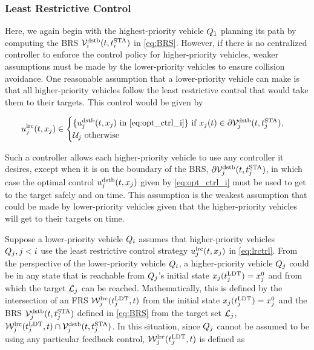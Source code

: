 \subsubsection{Least Restrictive Control \label{sec:lrc}}
Here, we again begin with the highest-priority vehicle $Q_1$ planning its path by computing the BRS $\mathcal{V}_i^\text{dstb}(t, t^\text{STA}_i)$ in \eqref{eq:BRS}. However, if there is no centralized controller to enforce the control policy for higher-priority vehicles, weaker assumptions must be made by the lower-priority vehicles to ensure collision avoidance. One reasonable assumption that a lower-priority vehicle can make is that all higher-priority vehicles follow the least restrictive control that would take them to their targets. This control would be given by 

\begin{equation}
\label{eq:lrctrl} %
\ctrl_j^\text{lrc}(t, \state_j)\in \begin{cases} \{\ctrl_j^\text{dstb}(t, \state_j) \text{ in } \eqref{eq:opt_ctrl_i}\} \text{ if } \state_j(t)\in \partial \brs_j^\text{dstb}(t, \sta_j), \\
\cset_j  \text{ otherwise}
\end{cases}
\end{equation}

Such a controller allows each higher-priority vehicle to use any controller it desires, except when it is on the boundary of the BRS, $\partial \mathcal{V}_j^\text{dstb}(t, t^\text{STA}_j)$, in which case the optimal control $u_j^\text{dstb}(t, x_j)$ given by \eqref{eq:opt_ctrl_i} must be used to get to the target safely and on time. This assumption is the weakest assumption that could be made by lower-priority vehicles given that the higher-priority vehicles will get to their targets on time.

Suppose a lower-priority vehicle $Q_i$ assumes that higher-priority vehicles $Q_j, j < i$ use the least restrictive control strategy $u_j^\text{lrc}(t, x_j)$ in \eqref{eq:lrctrl}. From the perspective of the lower-priority vehicle $Q_i$, a higher-priority vehicle $Q_j$ could be in any state that is reachable from $Q_j$'s initial state $x_j(t^\text{LDT}_j) = x_{j}^0$ and from which the target $\mathcal{L}_j$ can be reached. Mathematically, this is defined by the intersection of an FRS $\mathcal{W}_j^\text{lrc}(t^\text{LDT}_j, t)$ from the initial state $x_j(t^\text{LDT}_j)=x_{j}^0$ and the BRS $\mathcal{V}_j^\text{dstb}(t, t^\text{STA}_j)$ defined in \eqref{eq:BRS} from the target set $\mathcal{L}_j$, $\mathcal{W}_j^\text{lrc}(t^\text{LDT}_j, t) \cap \mathcal{V}_j^\text{dstb}(t, t^\text{STA}_j)$. In this situation, since $Q_j$ cannot be assumed to be using any particular feedback control, $\mathcal{W}_j^\text{lrc}(t^\text{LDT}_j, t)$ is defined as

